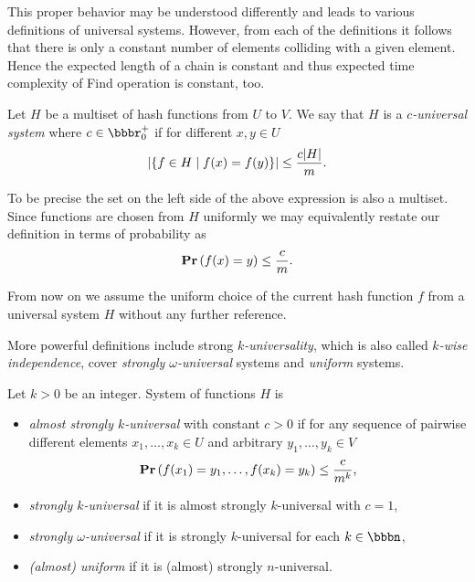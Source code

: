 This proper behavior may be understood differently and leads to various definitions of universal systems. However, from each of the definitions it follows that there is only a constant number of elements colliding with a given element. Hence the expected length of a chain is constant and thus expected time complexity of Find operation is constant, too.

\begin{definition}
\label{definition-c-universal-system}
Let $H$ be a multiset of hash functions from $U$ to $V$. We say that $H$ is a \emph{$c$-universal system} where $c \in \bbbr_0^+$ if for different $x, y \in U$
\[
\left|\lbrace f \in H \mid f(x) = f(y) \rbrace\right| \leq \frac{c|H|}{m}.
\]
\end{definition}

To be precise the set on the left side of the above expression is also a multiset. Since functions are chosen from $H$ uniformly we may equivalently restate our definition in terms of probability as
\[
\mathbf{Pr}\left(f(x) = y\right) \leq \frac{c}{m}.
\]

From now on we assume the uniform choice of the current hash function $f$ from a universal system $H$ without any further reference.

More powerful definitions include strong \emph{$k$-universality}, which is also called \emph{$k$-wise independence}, cover \emph{strongly $\omega$-universal} systems and \emph{uniform} systems.
\begin{definition}
Let $k > 0$ be an integer. System of functions $H$ is 
\begin{itemize}
	\item \emph{almost strongly $k$-universal} with constant $c > 0$ if for any sequence of pairwise different elements $x_1, \dots, x_k \in U$ and arbitrary $y_1, \dots, y_k \in V$ \[\mathbf{Pr}\left(f(x_1) = y_1, \dots, f(x_k) = y_k\right) \leq \frac{c}{m^k}\mbox{,}\]
	\item \emph{strongly $k$-universal} \cite{DBLP:conf/focs/WegmanC79} if it is almost strongly $k$-universal with $c = 1$,
	\item \emph{strongly $\omega$-universal} \cite{DBLP:conf/focs/WegmanC79} if it is strongly $k$-universal for each $k \in \bbbn$,
	\item \emph{(almost) uniform} \cite{DBLP:journals/siamcomp/PaghP08} if it is (almost) strongly $n$-universal.
\end{itemize}
\end{definition}

